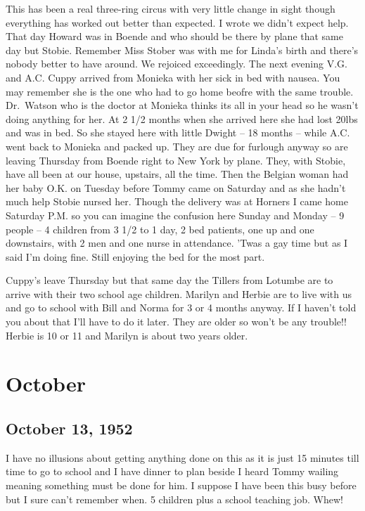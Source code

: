 \documentclass[
]{book}
\begin{document}
This has been a real three-ring circus with very little change in sight though everything has worked out better than expected. I wrote we didn't expect help. That day Howard was in Boende and who should be there by plane that same day but Stobie. Remember Miss Stober was with me for Linda's birth and there's nobody better to have around. We rejoiced exceedingly. The next evening V.G. and A.C. Cuppy arrived from Monieka with her sick in bed with nausea. You may remember she is the one who had to go home beofre with the same trouble. Dr.~Watson who is the doctor at Monieka thinks its all in your head so he wasn't doing anything for her. At 2 1/2 months when she arrived here she had lost 20lbs and was in bed. So she stayed here with little Dwight -- 18 months -- while A.C. went back to Monieka and packed up. They are due for furlough anyway so are leaving Thursday from Boende right to New York by plane. They, with Stobie, have all been at our house, upstairs, all the time. Then the Belgian woman had her baby O.K. on Tuesday before Tommy came on Saturday and as she hadn't much help Stobie nursed her. Though the delivery was at Horners I came home Saturday P.M. so you can imagine the confusion here Sunday and Monday -- 9 people -- 4 children from 3 1/2 to 1 day, 2 bed patients, one up and one downstairs, with 2 men and one nurse in attendance. 'Twas a gay time but as I said I'm doing fine. Still enjoying the bed for the most part.

Cuppy's leave Thursday but that same day the Tillers from Lotumbe are to arrive with their two school age children. Marilyn and Herbie are to live with us and go to school with Bill and Norma for 3 or 4 months anyway. If I haven't told you about that I'll have to do it later. They are older so won't be any trouble!! Herbie is 10 or 11 and Marilyn is about two years older.

\hypertarget{october-2}{%
\section{October}\label{october-2}}

\hypertarget{october-13-1952}{%
\subsection{October 13, 1952}\label{october-13-1952}}

I have no illusions about getting anything done on this as it is just 15 minutes till time to go to school and I have dinner to plan beside I heard Tommy wailing meaning something must be done for him. I suppose I have been this busy before but I sure can't remember when. 5 children plus a school teaching job. Whew!
\end{document}

